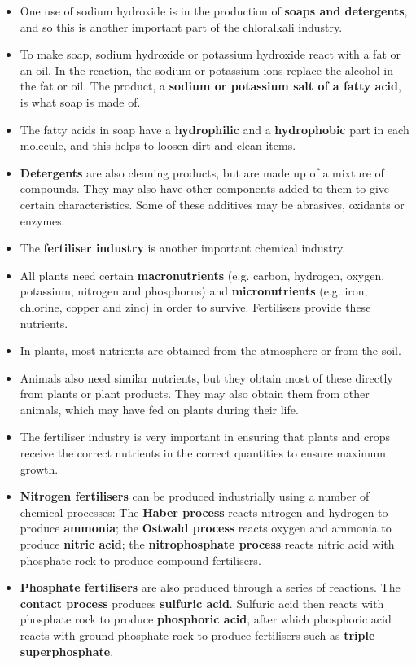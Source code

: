 \begin{itemize}
\item{One use of sodium hydroxide is in the production of \textbf{soaps and detergents}, and so this is another important part of the chloralkali industry.}
\item{To make soap, sodium hydroxide or potassium hydroxide react with a fat or an oil. In the reaction, the sodium or potassium ions replace the alcohol in the fat or oil. The product, a \textbf{sodium or potassium salt of a fatty acid}, is what soap is made of.}
\item{The fatty acids in soap have a \textbf{hydrophilic} and a \textbf{hydrophobic} part in each molecule, and this helps to loosen dirt and clean items.}
\item{\textbf{Detergents} are also cleaning products, but are made up of a mixture of compounds. They may also have other components added to them to give certain characteristics. Some of these additives may be abrasives, oxidants or enzymes.}
\item{The \textbf{fertiliser industry} is another important chemical industry.}
\item{All plants need certain \textbf{macronutrients} (e.g. carbon, hydrogen, oxygen, potassium, nitrogen and phosphorus) and \textbf{micronutrients} (e.g. iron, chlorine, copper and zinc) in order to survive. Fertilisers provide these nutrients.}
\item{In plants, most nutrients are obtained from the atmosphere or from the soil.}
\item{Animals also need similar nutrients, but they obtain most of these directly from plants or plant products. They may also obtain them from other animals, which may have fed on plants during their life.}
\item{The fertiliser industry is very important in ensuring that plants and crops receive the correct nutrients in the correct quantities to ensure maximum growth.} 
\item{\textbf{Nitrogen fertilisers} can be produced industrially using a number of chemical processes: The \textbf{Haber process} reacts nitrogen and hydrogen to produce \textbf{ammonia}; the \textbf{Ostwald process} reacts oxygen and ammonia to produce \textbf{nitric acid}; the \textbf{nitrophosphate process} reacts nitric acid with phosphate rock to produce compound fertilisers.}
\item{\textbf{Phosphate fertilisers} are also produced through a series of reactions. The \textbf{contact process} produces \textbf{sulfuric acid}. Sulfuric acid then reacts with phosphate rock to produce \textbf{phosphoric acid}, after which phosphoric acid reacts with ground phosphate rock to produce fertilisers such as \textbf{triple superphosphate}.}

\end{itemize}
